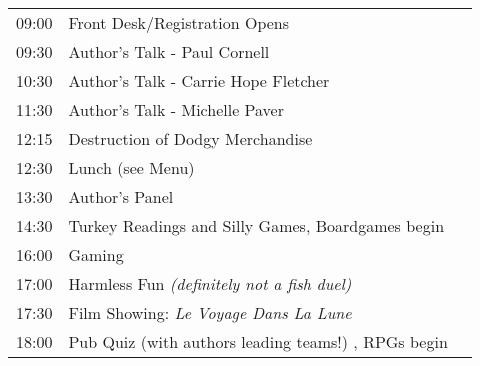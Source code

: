 \vspace{2mm} {\Large} \nopagebreak
\raggedright
\begin{center}
\begin{tabularx}{13cm}{c X l}

09:00 & Front Desk/Registration Opens\footnotemark[1] & \\
09:30 & Author's Talk - Paul Cornell\footnotemark[2] & \\
10:30 & Author's Talk - Carrie Hope Fletcher\footnotemark[2]\\
11:30 & Author's Talk - Michelle Paver\footnotemark[2]\\
12:15 & Destruction of Dodgy Merchandise \footnotemark[1]&\\
12:30 & Lunch (see Menu)\footnotemark[3] &\\
13:30 & Author's Panel\footnotemark[2] & \\ 
14:30 & Turkey Readings and Silly Games\footnotemark[2], Boardgames begin \footnotemark[4]&\\
16:00 & Gaming \footnotemark[5]\\
17:00 &  Harmless Fun \it(definitely not a fish duel)\footnotemark[1] &\\
17:30 & Film Showing: \it{Le Voyage Dans La Lune}\footnotemark[3] &\\
18:00 & Pub Quiz (with authors leading teams!) \footnotemark[3], RPGs begin \footnotemark[4]& \\
\end{tabularx}
\end{center}

